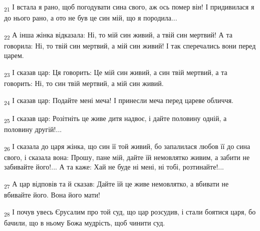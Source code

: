 \begin{tcolorbox}
\textsubscript{21} І встала я рано, щоб погодувати сина свого, аж ось помер він! І придивилася я до нього рано, а ото не був це син мій, що я породила...
\end{tcolorbox}
\begin{tcolorbox}
\textsubscript{22} А інша жінка відказала: Ні, то мій син живий, а твій син мертвий! А та говорила: Ні, то твій син мертвий, а мій син живий! І так сперечались вони перед царем.
\end{tcolorbox}
\begin{tcolorbox}
\textsubscript{23} І сказав цар: Ця говорить: Це мій син живий, а син твій мертвий, а та говорить: Ні, то син твій мертвий, а мій син живий.
\end{tcolorbox}
\begin{tcolorbox}
\textsubscript{24} І сказав цар: Подайте мені меча! І принесли меча перед цареве обличчя.
\end{tcolorbox}
\begin{tcolorbox}
\textsubscript{25} І сказав цар: Розітніть це живе дитя надвоє, і дайте половину одній, а половину другій!...
\end{tcolorbox}
\begin{tcolorbox}
\textsubscript{26} І сказала до царя жінка, що син її той живий, бо запалилася любов її до сина свого, і сказала вона: Прошу, пане мій, дайте їй немовлятко живим, а забити не забивайте його!... А та каже: Хай не буде ні мені, ні тобі, розтинайте!...
\end{tcolorbox}
\begin{tcolorbox}
\textsubscript{27} А цар відповів та й сказав: Дайте їй це живе немовлятко, а вбивати не вбивайте його. Вона його мати!
\end{tcolorbox}
\begin{tcolorbox}
\textsubscript{28} І почув увесь Єрусалим про той суд, що цар розсудив, і стали боятися царя, бо бачили, що в ньому Божа мудрість, щоб чинити суд.
\end{tcolorbox}
